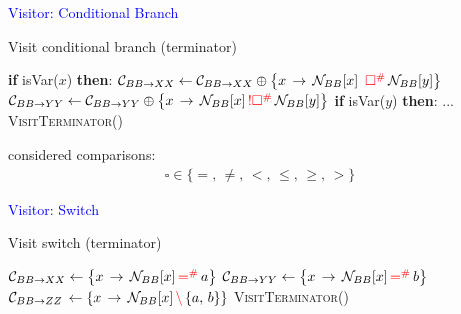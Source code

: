\begin{frame}[fragile]{\textcolor{blue}{Visitor: Conditional Branch}}


\begin{algorithm}[H]
\caption{Visit conditional branch (terminator)}
\begin{algorithmic}[1]
\State \textbf{if } isVar($x$) \textbf{then}:
\State \qquad$\mathcal{C}_{BB\rightarrow XX} \gets  \mathcal{C}_{BB\rightarrow XX} \oplus \left\lbrace  x\,\rightarrow\, \mathcal{N}_{BB}[x]\,\,\,{\color{red}\square^\#}\,\mathcal{N}_{BB}[y]
\right\rbrace$
\State \qquad$\mathcal{C}_{BB\rightarrow YY} \gets  \mathcal{C}_{BB\rightarrow YY} \oplus \left\lbrace  x\,\rightarrow\, \mathcal{N}_{BB}[x]\,{\color{red}!\square^\#}\,\mathcal{N}_{BB}[y]
\right\rbrace$
\State \textbf{if } isVar($y$) \textbf{then}:
\State \qquad ...
\State \textsc{VisitTerminator}()
\EndProcedure
\end{algorithmic}
\end{algorithm}
considered comparisons:
\begin{align*}
\square \in \{ =,\, \neq,\, < ,\,\le,\,\ge,\, > \}
\end{align*}




\end{frame}



\begin{frame}[fragile]{\textcolor{blue}{Visitor: Switch}}


\begin{algorithm}[H]
\caption{Visit switch (terminator)}
\begin{algorithmic}[1]
\State $\mathcal{C}_{BB\rightarrow XX} \gets \left\lbrace  x\,\rightarrow\, \mathcal{N}_{BB}[x]\,{\color{red}=^\#}\,a
\right\rbrace$
\State $\mathcal{C}_{BB\rightarrow YY} \gets \left\lbrace  x\,\rightarrow\, \mathcal{N}_{BB}[x]\,{\color{red}=^\#}\,b
\right\rbrace$
\State $\mathcal{C}_{BB\rightarrow ZZ} \,\gets \left\lbrace  x\,\rightarrow\, \mathcal{N}_{BB}[x]\,{\color{red}\backslash}\,\{a,\,b\}
\right\rbrace$
\State \textsc{VisitTerminator}()
\EndProcedure
\end{algorithmic}
\end{algorithm}


\end{frame}


